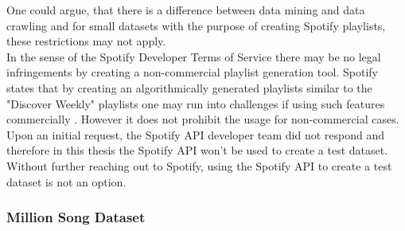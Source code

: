 One could argue, that there is a difference between data mining and data crawling and for small datasets with the purpose of creating Spotify playlists, these restrictions may not apply.\\ 
In the sense of the Spotify Developer Terms of Service \cite{spottac2} there may be no legal infringements by creating a non-commercial playlist generation tool. Spotify states that by creating an algorithmically generated playlists similar to the "Discover Weekly" playlists one may run into challenges if using such features commercially \cite{spottac3}. However it does not prohibit the usage for non-commercial cases. Upon an initial request, the Spotify API developer team did not respond and therefore in this thesis the Spotify API won't be used to create a test dataset. Without further reaching out to Spotify, using the Spotify API to create a test dataset is not an option. 

\subsubsection{Million Song Dataset}

